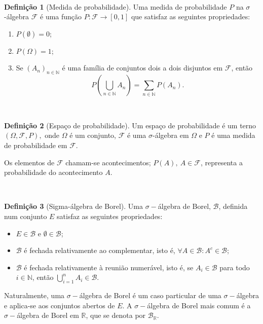 \documentclass[
  11pt,
  a4paper,
]{book}
\theoremstyle{definition}
\newtheorem{definition}{Definição}[chapter]
\theoremstyle{definition}
\theoremstyle{definition}
\theoremstyle{definition}
\theoremstyle{remark}
\begin{document}
\(\,\)

\begin{definition}[Medida de probabilidade]

Uma medida de probabilidade \(P\) na \(\sigma\)-álgebra \(\mathcal{F}\) é uma função \(P: \mathcal{F} \rightarrow [0,1]\) que satisfaz as seguintes propriedades:

\begin{enumerate}
\def\labelenumi{\roman{enumi})}
\item
  \(P(\emptyset) = 0\);
\item
  \(P(\Omega) = 1\);
\item
  Se \((A_n)_{n \in \mathbb{N}}\) é uma família de conjuntos dois a dois disjuntos em \(\mathcal{F}\), então
  \[P\left(\bigcup_{n \in \mathbb{N}}{A_n}\right)=\sum_{n \in \mathbb{N}}{P(A_n)}.\]
\end{enumerate}

\end{definition}

\(\,\)

\begin{definition}[Espaço de probabilidade]
Um espaço de probabilidade é um terno \((\Omega,\mathcal{F},P),\) onde \(\Omega\) é um conjunto, \(\mathcal{F}\) é uma \(\sigma\)-álgebra em \(\Omega\) e \(P\) é uma medida de probabilidade em \(\mathcal{F}\).

Os elementos de \(\mathcal{F}\) chamam-se acontecimentos; \(P(A), ~A \in \mathcal{F}\), representa a probabilidade do acontecimento \(A\).
\end{definition}

\(\,\)

\begin{definition}[Sigma-álgebra de Borel]
Uma \(\sigma-\)álgebra de Borel, \(\mathcal{B}\), definida num conjunto \(E\) satisfaz as seguintes propriedades:

\begin{itemize}
\item
  \(E \in \mathcal{B}\) e \(\emptyset \in \mathcal{B}\);
\item
  \(\mathcal{B}\) é fechada relativamente ao complementar, isto é,
  \(\forall A \in \mathcal{B}: A^c \in \mathcal{B}\);
\item
  \(\mathcal{B}\) é fechada relativamente à reunião numerável, isto é, se \(A_i \in \mathcal{B}\) para todo \(i \in \mathbb{N}\), então \(\bigcup\limits_{i=1}^{n} A_i \in \mathcal{B}\).
\end{itemize}

Naturalmente, uma \(\sigma-\)álgebra de Borel é um caso particular de uma \(\sigma-\)álgebra e aplica-se aos conjuntos abertos de \(E\). A \(\sigma-\)álgebra de Borel mais comum é a \(\sigma-\)álgebra de Borel em \(\mathbb{R}\), que se denota por \(\mathcal{B}_{\mathbb{R}}\).
\end{definition}
\end{document}
